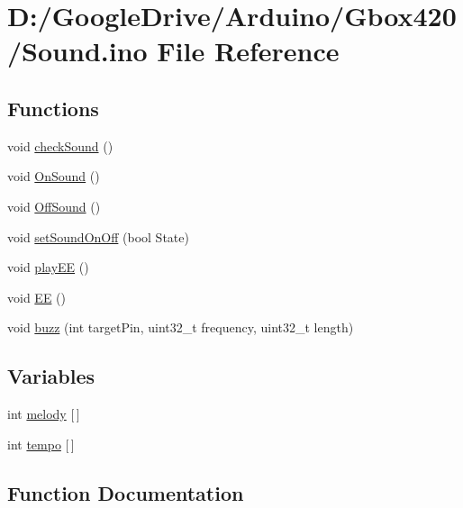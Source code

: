 \hypertarget{_sound_8ino}{}\section{D\+:/\+Google\+Drive/\+Arduino/\+Gbox420/\+Sound.ino File Reference}
\label{_sound_8ino}
\subsection*{Functions}
\begin{DoxyCompactItemize}
\item 
void \mbox{\hyperlink{_sound_8ino_ab3ab841232cf3669258f48cb453422e2}{check\+Sound}} ()
\item 
void \mbox{\hyperlink{_sound_8ino_a0466989c93ff7d4321060a5423eb997e}{On\+Sound}} ()
\item 
void \mbox{\hyperlink{_sound_8ino_abfa387c30742ec42b6f88869255e7d11}{Off\+Sound}} ()
\item 
void \mbox{\hyperlink{_sound_8ino_a2da81ea6c59e514b01a933ed8475281c}{set\+Sound\+On\+Off}} (bool State)
\item 
void \mbox{\hyperlink{_sound_8ino_a74e1eb2b9326ce9bbb5fca9634e019cd}{play\+EE}} ()
\item 
void \mbox{\hyperlink{_sound_8ino_ae1968785b57f1ebac51ec2ccfcd4f58e}{EE}} ()
\item 
void \mbox{\hyperlink{_sound_8ino_a9f8c3e2c0eb8b0f7c59cef22d80c8aad}{buzz}} (int target\+Pin, uint32\+\_\+t frequency, uint32\+\_\+t length)
\end{DoxyCompactItemize}
\subsection*{Variables}
\begin{DoxyCompactItemize}
\item 
int \mbox{\hyperlink{_sound_8ino_a56c8a5eda9a66e3eae61c7c18e163d43}{melody}} \mbox{[}$\,$\mbox{]}
\item 
int \mbox{\hyperlink{_sound_8ino_a6f6d5c0ba161267c02217acec1d2748d}{tempo}} \mbox{[}$\,$\mbox{]}
\end{DoxyCompactItemize}


\subsection{Function Documentation}
\mbox{\label{_sound_8ino_a9f8c3e2c0eb8b0f7c59cef22d80c8aad}} 
